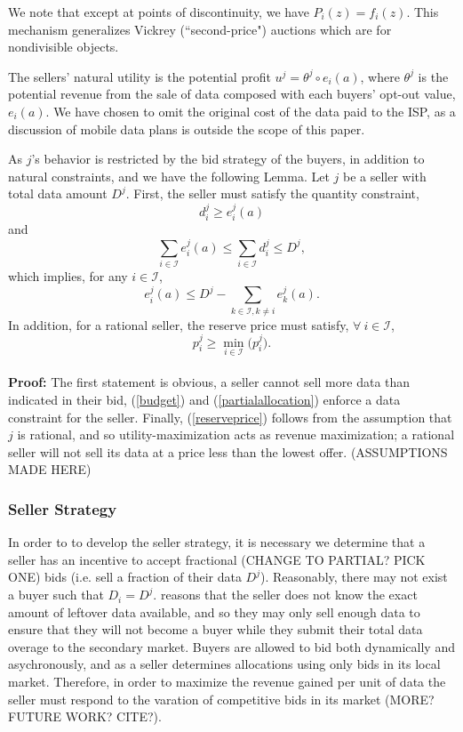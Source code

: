 \documentclass[12pt]{article}
\theoremstyle{definition}
\newcommand{\mcI}{\mathcal{I}}
\begin{document}
\begin{multicols}{2}
We note that except at points of discontinuity, we have
$P_i(z) = f_i(z)$. This mechanism generalizes Vickrey
(``second-price") auctions which are for nondivisible objects.

The sellers' natural utility is the potential
profit $u^j = \theta^j \circ e_i(a) $, where $\theta^j$ is the
potential revenue from the sale of data composed with each buyers' opt-out
value, $e_i(a)$. 
We have chosen to omit the original cost of the data
paid to the ISP, as a discussion of mobile data plans is outside the scope of this
paper.  

As $j$'s behavior is restricted by
the bid strategy of the buyers, in addition to natural constraints, and we have the following Lemma.
{
\label{constraints}
Let $j$ be a seller with total data amount $D^j$.
First, the seller must satisfy the quantity
constraint, 
\begin{equation}\label{quantity}
    d_i^j \ge e_i^j(a)
\end{equation}
and
\begin{equation}\label{budget}
    \displaystyle\sum_{i\in\mcI} e_i^j(a) \le \sum_{i\in\mcI} d^j_i \le D^j,
\end{equation}
which implies, for any $i\in\mcI$,
\begin{equation}\label{partialallocation}
    e_i^j(a) \le D^j - \sum_{k\in\mcI, k\ne i} e_k^j(a).
\end{equation}
In addition, for a rational seller, the reserve price must
satisfy, $\forall \ i\in \mcI$,
\begin{equation}\label{reserveprice}
   p_i^j \ge \min_{i\in\mcI}\big(p_i^j).
\end{equation}
}\\
\textbf{Proof:}
The first statement is obvious, 
a seller cannot sell more data than indicated in their bid, (\ref{budget}) and
(\ref{partialallocation}) enforce
a data constraint for the seller. Finally, (\ref{reserveprice})
follows from the assumption that $j$ is rational, and so utility-maximization
acts as revenue maximization; a rational seller will not sell its
data at a price less than the lowest offer. (ASSUMPTIONS MADE HERE)


\subsubsection{Seller Strategy}
In order to to develop the seller strategy, it is necessary we determine 
that a seller has an incentive to
accept fractional (CHANGE TO PARTIAL? PICK ONE) bids (i.e. sell a fraction of
their data $D^j$). Reasonably,
there may not exist a buyer such that $D_i = D^j$. \cite{zheng} reasons that the seller does not know the exact amount of
leftover data available, and so they may only sell enough data to ensure that
they will not become a buyer while they submit their total data overage to the
secondary market. Buyers are allowed to
bid both dynamically and asychronously, and as a seller determines allocations using only bids
in its local market. Therefore, in order to
maximize the revenue gained per unit of data the seller must respond to the
varation of competitive bids in its market (MORE? FUTURE WORK? CITE?).


\end{multicols}
\end{document}
